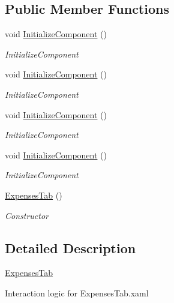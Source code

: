 \subsection*{Public Member Functions}
\begin{DoxyCompactItemize}
\item 
void \hyperlink{class_baudi_1_1_client_1_1_view_1_1_tabs_1_1_expenses_tab_a3fe609f15bda32cfee0d93d56e677cfa}{Initialize\+Component} ()
\begin{DoxyCompactList}\small\item\em Initialize\+Component \end{DoxyCompactList}\item 
void \hyperlink{class_baudi_1_1_client_1_1_view_1_1_tabs_1_1_expenses_tab_a3fe609f15bda32cfee0d93d56e677cfa}{Initialize\+Component} ()
\begin{DoxyCompactList}\small\item\em Initialize\+Component \end{DoxyCompactList}\item 
void \hyperlink{class_baudi_1_1_client_1_1_view_1_1_tabs_1_1_expenses_tab_a3fe609f15bda32cfee0d93d56e677cfa}{Initialize\+Component} ()
\begin{DoxyCompactList}\small\item\em Initialize\+Component \end{DoxyCompactList}\item 
void \hyperlink{class_baudi_1_1_client_1_1_view_1_1_tabs_1_1_expenses_tab_a3fe609f15bda32cfee0d93d56e677cfa}{Initialize\+Component} ()
\begin{DoxyCompactList}\small\item\em Initialize\+Component \end{DoxyCompactList}\item 
\hyperlink{class_baudi_1_1_client_1_1_view_1_1_tabs_1_1_expenses_tab_ac89d6cfc5324827b86159bd6e5d2cf73}{Expenses\+Tab} ()
\begin{DoxyCompactList}\small\item\em Constructor \end{DoxyCompactList}\end{DoxyCompactItemize}


\subsection{Detailed Description}
\hyperlink{class_baudi_1_1_client_1_1_view_1_1_tabs_1_1_expenses_tab}{Expenses\+Tab} 

Interaction logic for Expenses\+Tab.\+xaml 

